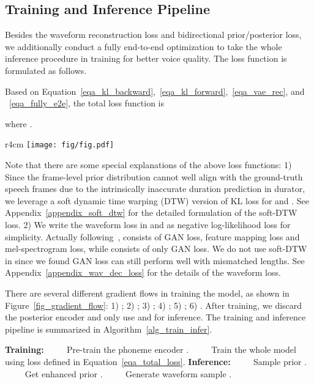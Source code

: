 \documentclass{article}
\theoremstyle{definition}
\def\myname{NaturalSpeech}
\begin{document}
\subsection{Training and Inference Pipeline}
\label{sec_train_infer}

Besides the waveform reconstruction loss and bidirectional prior/posterior loss, we additionally conduct a fully end-to-end optimization to take the whole inference procedure in training for better voice quality. The loss function is formulated as follows. 



Based on Equation~\ref{eqa_kl_backward},~\ref{eqa_kl_forward},~\ref{eqa_vae_rec}, and ~\ref{eqa_fully_e2e}, the total loss function is

where .


\begin{wrapfigure}{r}{4cm}
  \centering
\texttt{[image: fig/fig.pdf]}
\caption{Gradient flows.}
\label{fig_gradient_flow}
\vspace{-2mm}
\end{wrapfigure}
Note that there are some special explanations of the above loss functions: 1) Since the frame-level prior distribution  cannot well align with the ground-truth speech frames due to the intrinsically inaccurate duration prediction in durator, we leverage a soft dynamic time warping (DTW) version of KL loss for  and . See Appendix~\ref{appendix_soft_dtw} for the detailed formulation of the soft-DTW loss. 2) We write the waveform loss in   and  as negative log-likelihood loss for simplicity. Actually following~\cite{kong2020hifi},  consists of GAN loss, feature mapping loss and mel-spectrogram loss, while  consists of only GAN loss. We do not use soft-DTW in  since we found GAN loss can still perform well with mismatched lengths. See Appendix~\ref{appendix_wav_dec_loss} for the details of the waveform loss. 


There are several different gradient flows in training the model, as shown in Figure~\ref{fig_gradient_flow}: 1) ; 2) ; 3) ; 4) ; 5)  ; 6) . After training, we discard the posterior encoder  and only use  and  for inference. The training and inference pipeline is summarized in Algorithm~\ref{alg_train_infer}.

\begin{algorithm}[h]
\caption{Training and inference of \myname{}}
\label{alg}
\begin{algorithmic}[1]
\State \textbf{Training:}
\State ~~~~ Pre-train the phoneme encoder . 
\State ~~~~ Train the whole model  using loss  defined in Equation~\ref{eqa_total_loss}.
\State \textbf{Inference:} 
\State ~~~~ Sample prior .
\State ~~~~ Get enhanced prior .
\State ~~~~ Generate waveform sample . 
\end{algorithmic}
\label{alg_train_infer}
\end{algorithm}
\end{document}
